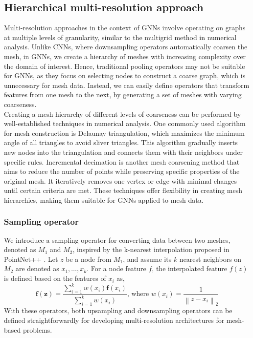\subsection{Hierarchical multi-resolution approach} 
\label{SO}
Multi-resolution approaches in the context of GNNs involve operating on graphs at multiple levels of granularity, similar to the multigrid method in numerical analysis. 
Unlike CNNs, where downsampling operators automatically coarsen the mesh, in GNNs, we create a hierarchy of meshes with increasing complexity over the domain of interest. Hence, traditional pooling operators may not be suitable for GNNs, as they focus on selecting nodes to construct a coarse graph, which is unnecessary for mesh data. Instead, we can easily define operators that transform features from one mesh to the next, by generating a set of meshes with varying coarseness.\\
Creating a mesh hierarchy of different levels of coarseness can be performed by well-established techniques in numerical analysis. One commonly used algorithm for mesh construction is Delaunay triangulation, which maximizes the minimum angle of all triangles to avoid sliver triangles. This algorithm gradually inserts new nodes into the triangulation and connects them with their neighbors under specific rules. Incremental decimation is another mesh coarsening method that aims to reduce the number of points while preserving specific properties of the original mesh. It iteratively removes one vertex or edge with minimal changes until certain criteria are met. These techniques offer flexibility in creating mesh hierarchies, making them suitable for GNNs applied to mesh data.\\
\subsubsection{Sampling operator}
We introduce a sampling operator for converting data between two meshes, denoted as $M_1$ and $M_2$, inspired by the k-nearest interpolation proposed in PointNet++ \cite{pnpp}. Let \(z\) be a node from \(M_1\), and assume its \(k\) nearest neighbors on \(M_2\) are denoted as \(x_1, \ldots, x_k\). For a node feature \(f\), the interpolated feature \(f(z)\) is defined based on the features of \(x_i\) as,
\begin{equation}
  \mathbf{f}(\mathbf{z})=\frac{\sum_{i=1}^k w\left(x_i\right) \mathbf{f}\left(x_i\right)}{\sum_{i=1}^k w\left(x_i\right)} \text {, where } w\left(x_i\right)=\frac{1}{\left\|z-x_i\right\|_2}
  \end{equation}
With these operators, both upsampling and downsampling operators can be defined straightforwardly for developing multi-resolution architectures for mesh-based problems.

